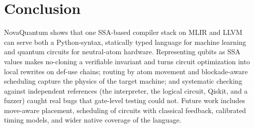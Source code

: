 \documentclass[11pt]{article}
\begin{document}
\section{Conclusion}

NovaQuantum shows that one SSA-based compiler stack on MLIR and LLVM can serve both a Python-syntax, statically typed
language for machine learning and quantum circuits for neutral-atom hardware. Representing qubits as SSA values
makes no-cloning a verifiable invariant and turns circuit optimization into local rewrites on def-use chains;
routing by atom movement and blockade-aware scheduling capture the physics of the target machine; and systematic
checking against independent references (the interpreter, the logical circuit, Qiskit, and a fuzzer) caught real
bugs that gate-level testing could not. Future work includes move-aware placement, scheduling of circuits with
classical feedback, calibrated timing models, and wider native coverage of the language.
\end{document}
